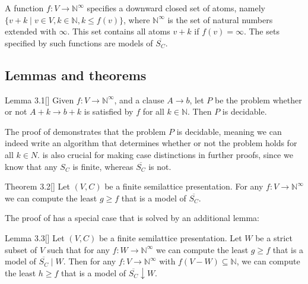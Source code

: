 A function $f : V \rightarrow \mathbb{N}^{\infty}$ specifies a downward closed set of atoms,
namely $\{v + k \mid v \in V, k \in \mathbb{N}, k \le f(v)\}$,
where $\mathbb{N}^{\infty}$ is the set of natural numbers extended with $\infty$.
This set contains all atoms $v + k$ if $f(v) = \infty$.
The sets specified by such functions are models of $\overline{S_C}$.

\subsection{Lemmas and theorems}
\label{ssec:lemmas_and_theorems}

\begin{customlem}{Lemma 3.1}[{\cite[p.~3]{mbezem}}]
\label{lem:3.1}
Given $f : V \rightarrow \mathbb{N}^{\infty}$,
and a clause $A \rightarrow b$, let $P$ be the problem whether or not
$A + k \rightarrow b + k$ is satisfied by $f$ for all $k \in \mathbb{N}$.
Then $P$ is decidable.
\end{customlem}

The proof of  demonstrates that the problem $P$
is decidable, meaning we can indeed write an algorithm that
determines whether or not the problem holds for all $k \in N$.
 is also crucial for making case distinctions
in further proofs, since we know that any $S_C$ is finite,
whereas $\overline{S_C}$ is not.

\begin{customthm}{Theorem 3.2}[{\cite[p.~3]{mbezem}}]
\label{thm:3.2}
Let $(V, C)$ be a finite semilattice presentation.
For any $f : V \rightarrow \mathbb{N}^{\infty}$
we can compute the least $g \ge f$ that is a model of $\overline{S_C}$.
\end{customthm}

The proof of  has a special case that is solved by an additional lemma:

\begin{customlem}{Lemma 3.3}[{\cite[p.~3]{mbezem}}]
\label{lem:3.3}
Let $(V, C)$ be a finite semilattice presentation.
Let $W$ be a strict subset of $V$ such that for any
$f : W \rightarrow \mathbb{N}^{\infty}$ we can
compute the least $g \geq f$ that is a model of $\overline{S_C} \mid W$.
Then for any $f : V \rightarrow \mathbb{N}^{\infty}$ with $f(V - W) \subseteq \mathbb{N}$,
we can compute the least $h \geq f$ that is a model of $\overline{S_C} \downarrow W$.
\end{customlem}
